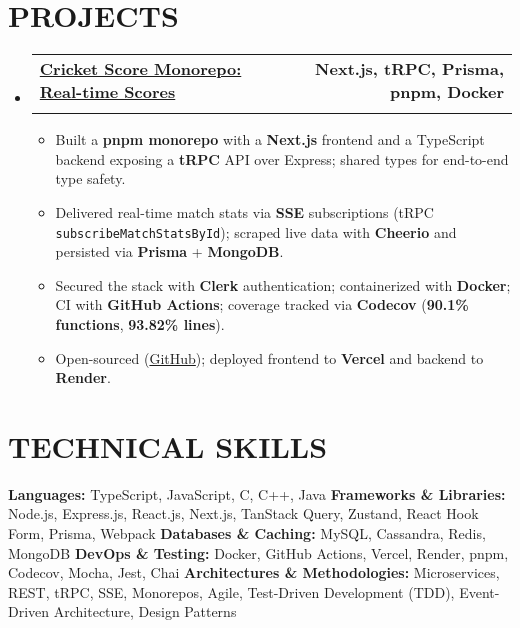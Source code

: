 \documentclass[letterpaper,11pt]{article}
\makeatletter
\newcommand{\resumeSubheading}[4]{
  \vspace{-2pt}\item
    \begin{tabular*}{1.0\textwidth}[t]{l@{\extracolsep{\fill}}r}
      \textbf{\large#1} & \textbf{\small #2} \\
      \textit{\large#3} & \textit{\small #4} \\
    \end{tabular*}\vspace{-7pt}
}
\newcommand{\resumeItem}[1]{
  \item\small{
    {#1 \vspace{-2pt}}
  }
}
\newcommand{\resumeSubHeadingListStart}{\begin{itemize}[leftmargin=0.0in, label={}]}
\newcommand{\resumeSubHeadingListEnd}{\end{itemize}}
\newcommand{\resumeItemListStart}{\begin{itemize}}
\newcommand{\resumeItemListEnd}{\end{itemize}\vspace{-5pt}}
\newcommand{\hideicon}[1]{\BeginAccSupp{method=pdfstringdef,ActualText= }#1\EndAccSupp{}}
\makeatother
\begin{document}
\section{PROJECTS}
  \resumeSubHeadingListStart
    \resumeSubheading
      {\href{https://cricscore.deveshsangwan.com/}{Cricket Score Monorepo: Real-time Scores \raisebox{-0.1\height}{\hideicon{\faLink}}}}{Next.js, tRPC, Prisma, pnpm, Docker}{}{}
      \vspace{-10pt}
    \resumeItemListStart
        \resumeItem{Built a \textbf{pnpm monorepo} with a \textbf{Next.js} frontend and a TypeScript backend exposing a \textbf{tRPC} API over Express; shared types for end-to-end type safety.}
        \resumeItem{Delivered real-time match stats via \textbf{SSE} subscriptions (tRPC \texttt{subscribeMatchStatsById}); scraped live data with \textbf{Cheerio} and persisted via \textbf{Prisma} + \textbf{MongoDB}.}
        \resumeItem{Secured the stack with \textbf{Clerk} authentication; containerized with \textbf{Docker}; CI with \textbf{GitHub Actions}; coverage tracked via \textbf{Codecov} (\textbf{90.1\% functions}, \textbf{93.82\% lines}).}
        \resumeItem{Open-sourced (\href{https://github.com/deveshsangwan/cricketScoreApi}{GitHub}); deployed frontend to \textbf{Vercel} and backend to \textbf{Render}.}
    \resumeItemListEnd
  \resumeSubHeadingListEnd

\section{TECHNICAL SKILLS}
    \small{
    \textbf{Languages:} TypeScript, JavaScript, C, C++, Java \newline
    \textbf{Frameworks \& Libraries:} Node.js, Express.js, React.js, Next.js, TanStack Query, Zustand, React Hook Form, Prisma, Webpack \newline
    \textbf{Databases \& Caching:} MySQL, Cassandra, Redis, MongoDB \newline
    \textbf{DevOps \& Testing:} Docker, GitHub Actions, Vercel, Render, pnpm, Codecov, Mocha, Jest, Chai \newline
    \textbf{Architectures \& Methodologies:} Microservices, REST, tRPC, SSE, Monorepos, Agile, Test-Driven Development (TDD), Event-Driven Architecture, Design Patterns
    }

\end{document}
